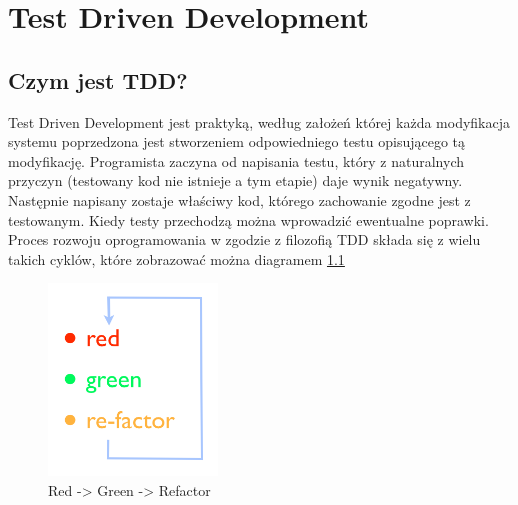 
\chapter[Test Driven Development]{Test Driven Development}
  \section{Czym jest TDD?}
    Test Driven Development jest praktyką, według założeń której każda modyfikacja systemu poprzedzona jest stworzeniem odpowiedniego testu opisującego tą modyfikację. Programista zaczyna od napisania testu, który z naturalnych przyczyn (testowany kod nie istnieje a tym etapie) daje wynik negatywny. Następnie napisany zostaje właściwy kod, którego zachowanie zgodne jest z testowanym. Kiedy testy przechodzą można wprowadzić ewentualne poprawki.
    Proces rozwoju oprogramowania w zgodzie z filozofią TDD składa się z wielu takich cyklów, które zobrazować można diagramem \ref{red_green_refactor}
    
     \begin{figure}[!h]
   		\begin{center}
   			\includegraphics[width=0.4\textwidth]{images/tdd_red_green_refactor.png}
   			\caption{Red -> Green -> Refactor}
   			\label{red_green_refactor}
   		\end{center}
   	\end{figure}
   	
   	\clearpage
    
